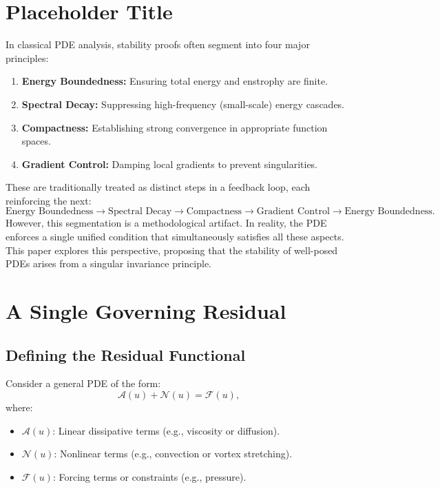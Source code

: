 \section{Placeholder Title}
In classical PDE analysis, stability proofs often segment into four major principles:
\begin{enumerate}
    \item \textbf{Energy Boundedness:} Ensuring total energy and enstrophy are finite.
    \item \textbf{Spectral Decay:} Suppressing high-frequency (small-scale) energy cascades.
    \item \textbf{Compactness:} Establishing strong convergence in appropriate function spaces.
    \item \textbf{Gradient Control:} Damping local gradients to prevent singularities.
\end{enumerate}
These are traditionally treated as distinct steps in a feedback loop, each reinforcing the next:
\begin{equation*}
\text{Energy Boundedness} \to \text{Spectral Decay} \to \text{Compactness} \to \text{Gradient Control} \to \text{Energy Boundedness.}
\end{equation*}
However, this segmentation is a methodological artifact. In reality, the PDE enforces a single unified condition that simultaneously satisfies all these aspects. This paper explores this perspective, proposing that the stability of well-posed PDEs arises from a singular invariance principle.

\section{A Single Governing Residual}

\subsection{Defining the Residual Functional}
Consider a general PDE of the form:
\begin{equation}
\mathcal{A}(u) + \mathcal{N}(u) = \mathcal{F}(u),
\end{equation}
where:
\begin{itemize}
    \item \(\mathcal{A}(u)\): Linear dissipative terms (e.g., viscosity or diffusion).
    \item \(\mathcal{N}(u)\): Nonlinear terms (e.g., convection or vortex stretching).
    \item \(\mathcal{F}(u)\): Forcing terms or constraints (e.g., pressure).
\end{itemize}

